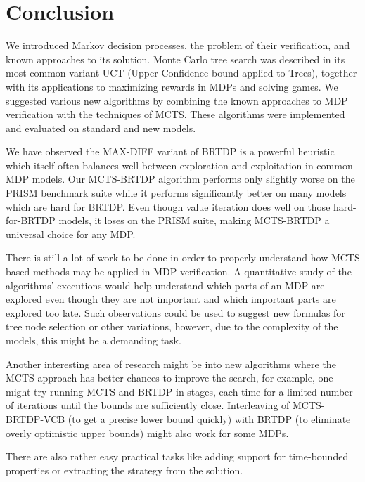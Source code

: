 \chapter{Conclusion}

We introduced Markov decision processes, the problem of their
verification, and known approaches to its solution.  Monte Carlo tree
search was described in its most common variant UCT (Upper Confidence
bound applied to Trees), together with its applications to maximizing
rewards in MDPs and solving games.
We suggested various new algorithms by combining the known
approaches to MDP verification with the techniques of MCTS. These
algorithms were implemented and evaluated on standard and new models.

We have observed the MAX-DIFF variant of BRTDP is a powerful
heuristic which itself often balances well between exploration and
exploitation in common MDP models.
Our MCTS-BRTDP algorithm performs only slightly worse on the PRISM
benchmark suite while it performs significantly better on many models
which are hard for BRTDP.  Even though value iteration does well on
those hard-for-BRTDP models, it loses on the PRISM suite, making
MCTS-BRTDP a universal choice for any MDP.

There is still a lot of work to be done in order to properly understand
how MCTS based methods may be applied in MDP verification. A
quantitative study of the algorithms' executions would help understand
which parts
of an MDP are explored even though they are not important and which
important parts are explored too late. Such observations could be used
to suggest new formulas for tree node selection or other variations,
however, due to the complexity of the models, this might be a demanding task.

Another interesting area of research might be into
new algorithms where the MCTS approach has better chances to
improve the search, for example, one might try running MCTS and BRTDP in
stages, each time for a limited number of iterations until the bounds
are sufficiently close. Interleaving of MCTS-BRTDP-VCB (to get a precise
lower bound quickly) with BRTDP (to eliminate overly optimistic upper
bounds) might also work for some MDPs.

There are also rather easy practical tasks like adding support for
time-bounded properties or extracting the strategy from the solution.
